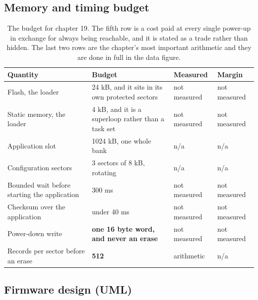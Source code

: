 \subsection*{Memory and timing budget}

\begin{table}[H]\centering\small
\begin{tabular}{p{44mm}p{28mm}p{28mm}p{30mm}}
\toprule
Quantity & Budget & Measured & Margin \\
\midrule
Flash, the loader & 24 kB, and it sits in its own protected sectors & not measured & not measured \\
Static memory, the loader & 4 kB, and it is a superloop rather than a task set & not measured & not measured \\
Application slot & 1024 kB, one whole bank & n/a & n/a \\
Configuration sectors & 3 sectors of 8 kB, rotating & n/a & n/a \\
Bounded wait before starting the application & 300 ms & not measured & not measured \\
Checksum over the application & under 40 ms & not measured & not measured \\
Power-down write & \textbf{one 16 byte word, and never an erase} & not measured & not measured \\
Records per sector before an erase & \textbf{512} & arithmetic & n/a \\
\bottomrule
\end{tabular}
\caption{The budget for chapter 19. The fifth row is a cost paid at every single power-up in exchange for always being reachable, and it is stated as a trade rather than hidden. The last two rows are the chapter's most important arithmetic and they are done in full in the data figure.}
\end{table}

\subsection*{Firmware design (UML)}


